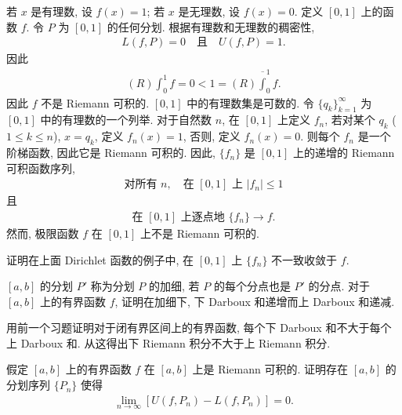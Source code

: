 \documentclass[../../main.tex]{subfiles}
\begin{document}
\begin{example}[Dirichlet 函数]\label{example:ch04-Dirichlet}
若 $x$ 是有理数, 设 $f(x)=1$; 若 $x$ 是无理数, 设 $f(x)=0$. 定义 $[0,1]$ 上的函数 $f$. 令 $P$ 为 $[0,1]$ 的任何分划. 根据有理数和无理数的稠密性,
\begin{align*}
L(f,P)=0\quad\text{且}\quad U(f,P)=1.
\end{align*}
因此
\begin{align*}
(R)\int_{0}^{1}f=0<1=(R)\overline{\int}_{0}^{1}f.
\end{align*}
因此 $f$ 不是 Riemann 可积的. $[0,1]$ 中的有理数集是可数的. 令 $\{q_{k}\}_{k=1}^{\infty}$ 为 $[0,1]$ 中的有理数的一个列举. 对于自然数 $n$, 在 $[0,1]$ 上定义 $f_{n}$, 若对某个 $q_{k}$ ($1\leqslant k\leqslant n$), $x=q_{k}$, 定义 $f_{n}(x)=1$, 否则, 定义 $f_{n}(x)=0$. 则每个 $f_{n}$ 是一个阶梯函数, 因此它是 Riemann 可积的. 因此, $\{f_{n}\}$ 是 $[0,1]$ 上的递增的 Riemann 可积函数序列,
\begin{align*}
\text{对所有 }n,\quad\text{在 }[0,1]\text{ 上 }|f_{n}|\leqslant 1
\end{align*}
且
\begin{align*}
\text{在 }[0,1]\text{ 上逐点地 }\{f_{n}\}\to f.
\end{align*}
然而, 极限函数 $f$ 在 $[0,1]$ 上不是 Riemann 可积的.
\end{example}

\begin{exercise}\label{exercise:ch04-01}
证明在上面 Dirichlet 函数的例子中, 在 $[0,1]$ 上 $\{f_{n}\}$ 不一致收敛于 $f$.
\end{exercise}

\begin{exercise}\label{exercise:ch04-02}
$[a,b]$ 的分划 $P'$ 称为分划 $P$ 的加细, 若 $P$ 的每个分点也是 $P'$ 的分点. 对于 $[a,b]$ 上的有界函数 $f$, 证明在加细下, 下 Darboux 和递增而上 Darboux 和递减.
\end{exercise}

\begin{exercise}\label{exercise:ch04-03}
用前一个习题证明对于闭有界区间上的有界函数, 每个下 Darboux 和不大于每个上 Darboux 和. 从这得出下 Riemann 积分不大于上 Riemann 积分.
\end{exercise}

\begin{exercise}\label{exercise:ch04-04}
假定 $[a,b]$ 上的有界函数 $f$ 在 $[a,b]$ 上是 Riemann 可积的. 证明存在 $[a,b]$ 的分划序列 $\{P_{n}\}$ 使得
\begin{align*}
\lim_{n\to\infty}[U(f,P_{n})-L(f,P_{n})]=0.
\end{align*}
\end{exercise}
\end{document}

